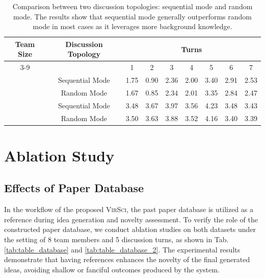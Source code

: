 \documentclass[11pt]{article}
\def\modelname{\textsc{VirSci\xspace}}
\begin{document}
\begin{table}[ht]
\centering
\begin{threeparttable}
\begin{tabular}{cc|ccccccc}
\toprule
 \multirow{2}{*}{Team Size} & \multirow{2}{*}{Discussion Topology}   & \multicolumn{7}{c}{Turns} \\ \cmidrule{3-9}
   &   & 1 & 2 & 3 & 4 & 5 & 6 & 7\\
\midrule
 \rowcolor{gray!15}
 \cellcolor{white}\multirow{2}{*}{4} & Sequential Mode & 1.75 & 0.90 & 2.36 & 2.00 &  3.40 &  2.91 & 2.53 \\
 & Random Mode & 1.67 & 0.85 & 2.34 & 2.01 &  3.35 &  2.84 & 2.47 \\ \midrule
 \rowcolor{gray!15}
 \cellcolor{white}\multirow{2}{*}{8} & Sequential Mode & 3.48 & 3.67 & 3.97 & 3.56 & 4.23 &  3.48 & 3.43 \\
 & Random Mode & 3.50 & 3.63 & 3.88 & 3.52 &  4.16 &  3.40 & 3.39 \\

\bottomrule
\end{tabular}
\end{threeparttable}
\caption{Comparison between two discussion topologies: sequential mode and random mode. The results show that sequential mode generally outperforms random mode in most cases as it leverages more background knowledge.}
\label{tab:ablation_topology}
\end{table}

\section{Ablation Study}

\subsection{Effects of Paper Database}\label{sec:ablation_database}

In the workflow of the proposed \modelname, the past paper database is utilized as a reference during idea generation and novelty assessment. To verify the role of the constructed paper database, we conduct ablation studies on both datasets under the setting of 8 team members and 5 discussion turns, as shown in Tab. \ref{tab:table_database} and \ref{tab:table_database_2}. The experimental results demonstrate that having references enhances the novelty of the final generated ideas, avoiding shallow or fanciful outcomes produced by the system.
\end{document}
